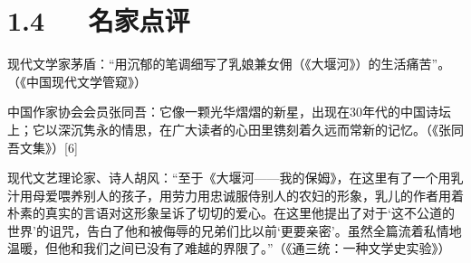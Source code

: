 \documentclass[letterpaper,12pt,english]{sphinxmanual}
\begin{document}
\section{1.4   名家点评}
\label{\detokenize{p01_u6563_u6587/_u827e_u9752-_u5927_u5830_u6cb3_u2014_u2014_u6211_u7684_u4fdd_u59c6:id6}}
现代文学家茅盾：“用沉郁的笔调细写了乳娘兼女佣（《大堰河》）的生活痛苦”。（《中国现代文学管窥》）

中国作家协会会员张同吾：它像一颗光华熠熠的新星，出现在30年代的中国诗坛上；它以深沉隽永的情思，在广大读者的心田里镌刻着久远而常新的记忆。（《张同吾文集》）{[}6{]}

现代文艺理论家、诗人胡风：“至于《大堰河——我的保姆》，在这里有了一个用乳汁用母爱喂养别人的孩子，用劳力用忠诚服侍别人的农妇的形象，乳儿的作者用着朴素的真实的言语对这形象呈诉了切切的爱心。在这里他提出了对于‘这不公道的世界’的诅咒，告白了他和被侮辱的兄弟们比以前‘更要亲密’。虽然全篇流着私情地温暖，但他和我们之间已没有了难越的界限了。”（《通三统：一种文学史实验》）
\end{document}
